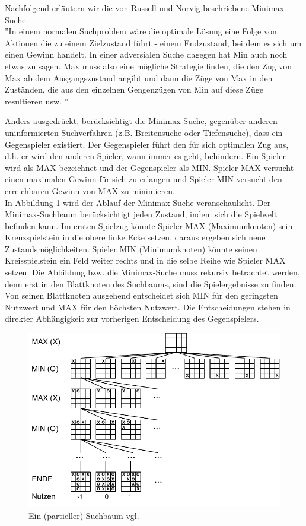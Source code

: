 Nachfolgend erläutern wir die von Russell und Norvig beschriebene Minimax-Suche. \\

''In einem normalen Suchproblem wäre die optimale Lösung eine Folge von Aktionen die zu einem Zielzustand führt - einem Endzustand, bei dem es sich um einen Gewinn handelt. In einer adversialen Suche dagegen hat Min auch noch etwas zu sagen. Max muss also eine mögliche Strategie finden, die den Zug von Max ab dem Ausgangszustand angibt und dann die Züge von Max in den Zuständen, die aus den einzelnen Gengenzügen von Min auf diese Züge resultieren usw. \cite[208]{Russell}''

Anders ausgedrückt, berücksichtigt die Minimax-Suche, gegenüber anderen uninformierten Suchverfahren (z.B. Breitensuche oder Tiefensuche), dass ein Gegenspieler existiert. Der Gegenspieler führt den für sich optimalen Zug aus, d.h. er wird den anderen Spieler, wann immer es geht, behindern. Ein Spieler wird als MAX bezeichnet und der Gegenspieler als MIN. Spieler MAX versucht einen maximalen Gewinn für sich zu erlangen und Spieler MIN versucht den erreichbaren Gewinn von MAX zu minimieren.\\

In Abbildung \ref{fig:minimax_tictactoe} wird der Ablauf der Minimax-Suche veranschaulicht. Der Minimax-Suchbaum berücksichtigt jeden Zustand, indem sich die Spielwelt befinden kann. Im ersten Spielzug könnte Spieler MAX (Maximumknoten) sein Kreuzspielstein in die obere linke Ecke setzen, daraus ergeben sich neue Zustandsmöglichkeiten. Spieler MIN (Minimumknoten) könnte seinen Kreisspielstein ein Feld weiter rechts und in die selbe Reihe wie Spieler MAX setzen. Die Abbildung bzw. die Minimax-Suche muss rekursiv betrachtet werden, denn erst in den Blattknoten des Suchbaums, sind die Spielergebnisse zu finden. Von seinen Blattknoten ausgehend entscheidet sich MIN für den geringsten Nutzwert und MAX für den höchsten Nutzwert. Die Entscheidungen stehen in direkter Abhängigkeit zur vorherigen Entscheidung des Gegenspielers. \\
\newpage
  
\begin{figure}[!htbp]
  \centering
  \includegraphics{inhalt/abbildungen/minimax_tictactoe.pdf}
  \caption{Ein (partieller) Suchbaum vgl. \cite[208]{Russell}}
  \label{fig:minimax_tictactoe}
\end{figure} 

